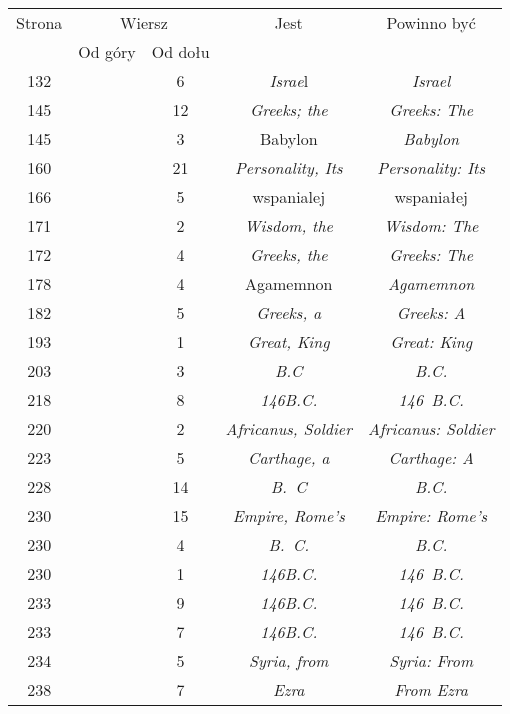 \documentclass[a4paper,11pt]{article}
\begin{document}
\begin{center}
  \begin{tabular}{|c|c|c|c|c|}
    \hline
    Strona & \multicolumn{2}{c|}{Wiersz} & Jest
                              & Powinno być \\ \cline{2-3}
    & Od góry & Od dołu & & \\
    \hline
    132 & & \hphantom{0}6 & \textit{Israe}l & \textit{Israel} \\
    145 & & 12 & \textit{Greeks; the} & \textit{Greeks: The} \\
    145 & & \hphantom{0}3 & Babylon & \textit{Babylon} \\
    160 & & 21 & \textit{Personality, Its} & \textit{Personality: Its} \\
    166 & & \hphantom{0}5 & wspanialej & wspaniałej \\
    171 & & \hphantom{0}2 & \textit{Wisdom, the} & \textit{Wisdom: The} \\
    172 & & \hphantom{0}4 & \textit{Greeks, the} & \textit{Greeks: The} \\
    178 & & \hphantom{0}4 & Agamemnon & \textit{Agamemnon} \\
    182 & & \hphantom{0}5 & \textit{Greeks, a} & \textit{Greeks: A} \\
    193 & & \hphantom{0}1 & \textit{Great, King} & \textit{Great: King} \\
    203 & & \hphantom{0}3 & \textit{B.C} & \textit{B.C.} \\
    218 & & \hphantom{0}8 & \textit{146B.C.} & \textit{146~B.C.} \\
    220 & & \hphantom{0}2 & \textit{Africanus, Soldier}
           & \textit{Africanus: Soldier} \\
    223 & & \hphantom{0}5 & \textit{Carthage, a} & \textit{Carthage: A} \\
    228 & & 14 & \textit{B.~C} & \textit{B.C.} \\
    230 & & 15 & \textit{Empire, Rome's} & \textit{Empire: Rome's} \\
    230 & & \hphantom{0}4 & \textit{B.~C.} & \textit{B.C.} \\
    230 & & \hphantom{0}1 & \textit{146B.C.} & \textit{146~B.C.} \\
    233 & & \hphantom{0}9 & \textit{146B.C.} & \textit{146~B.C.} \\
    233 & & \hphantom{0}7 & \textit{146B.C.} & \textit{146~B.C.} \\
    234 & & \hphantom{0}5 & \textit{Syria, from} & \textit{Syria: From} \\
    238 & & \hphantom{0}7 & \textit{Ezra} & \textit{From Ezra} \\

\end{tabular}
\end{center}
\end{document}
